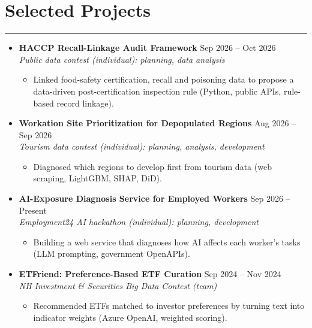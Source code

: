 \documentclass[letterpaper, 10pt]{article}
\begin{document}
\section*{Selected Projects}
\hrule
\vspace{4pt}
\begin{itemize}
    \item \textbf{HACCP Recall-Linkage Audit Framework} \hfill Sep 2026 -- Oct 2026 \\
        \textit{Public data contest (individual): planning, data analysis}
        \begin{itemize}
            \item Linked food-safety certification, recall and poisoning data to propose a data-driven post-certification inspection rule (Python, public APIs, rule-based record linkage).
        \end{itemize}
    \item \textbf{Workation Site Prioritization for Depopulated Regions} \hfill Aug 2026 -- Sep 2026 \\
        \textit{Tourism data contest (individual): planning, analysis, development}
        \begin{itemize}
            \item Diagnosed which regions to develop first from tourism data (web scraping, LightGBM, SHAP, DiD).
        \end{itemize}
    \item \textbf{AI-Exposure Diagnosis Service for Employed Workers} \hfill Sep 2026 -- Present \\
        \textit{Employment24 AI hackathon (individual): planning, development}
        \begin{itemize}
            \item Building a web service that diagnoses how AI affects each worker's tasks (LLM prompting, government OpenAPIs).
        \end{itemize}
    \item \textbf{ETFriend: Preference-Based ETF Curation} \hfill Sep 2024 -- Nov 2024 \\
        \textit{NH Investment \& Securities Big Data Contest (team)}
        \begin{itemize}
            \item Recommended ETFs matched to investor preferences by turning text into indicator weights (Azure OpenAI, weighted scoring).
        \end{itemize}
\end{itemize}
\end{document}

